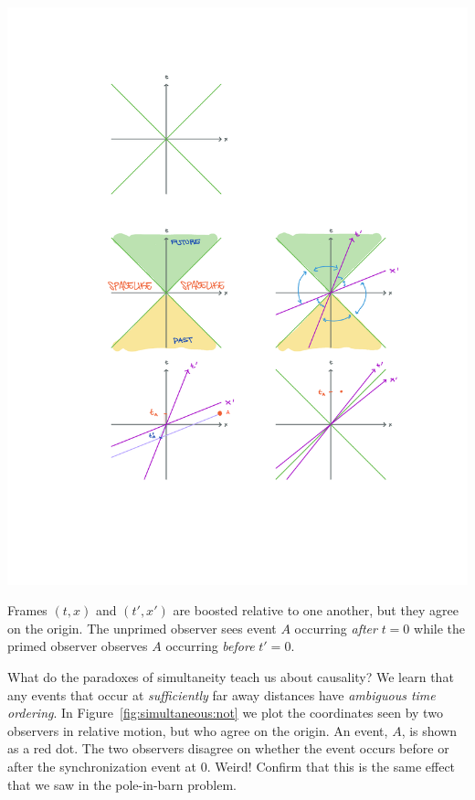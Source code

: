 \begin{marginfigure}%
    \includegraphics[width=.8\textwidth]{figures/spacetime_simultaneity.pdf}
    \caption{Frames $(t,x)$ and $(t',x')$ are boosted relative to one another, but they agree on the origin. The unprimed observer sees event $A$ occurring \emph{after} $t=0$ while the primed observer observes $A$ occurring \emph{before} $t'=0$.}
    \label{fig:simultaneous:not}
\end{marginfigure}
What do the paradoxes of simultaneity teach us about causality? We learn that any events that occur at \emph{sufficiently} far away distances have \emph{ambiguous time ordering}. In Figure~\ref{fig:simultaneous:not} we plot the coordinates seen by two observers in relative motion, but who agree on the origin. An event, $A$, is shown as a red dot. The two observers disagree on whether the event occurs before or after the synchronization event at 0. Weird! Confirm that this is the same effect that we saw in the pole-in-barn problem.

